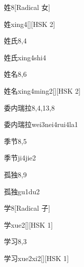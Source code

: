 \begin{entry}{姓}{8}[Radical 女]
  \begin{phonetics}{姓}{xing4}[][HSK 2]
  \end{phonetics}
\end{entry}

\begin{entry}{姓氏}{8,4}
  \begin{phonetics}{姓氏}{xing4shi4}
  \end{phonetics}
\end{entry}

\begin{entry}{姓名}{8,6}
  \begin{phonetics}{姓名}{xing4ming2}[][HSK 2]
  \end{phonetics}
\end{entry}

\begin{entry}{委内瑞拉}{8,4,13,8}
  \begin{phonetics}{委内瑞拉}{wei3nei4rui4la1}
  \end{phonetics}
\end{entry}

\begin{entry}{季节}{8,5}
  \begin{phonetics}{季节}{ji4jie2}
  \end{phonetics}
\end{entry}

\begin{entry}{孤独}{8,9}
  \begin{phonetics}{孤独}{gu1du2}
  \end{phonetics}
\end{entry}

\begin{entry}{学}{8}[Radical 子]
  \begin{phonetics}{学}{xue2}[][HSK 1]
  \end{phonetics}
\end{entry}

\begin{entry}{学习}{8,3}
  \begin{phonetics}{学习}{xue2xi2}[][HSK 1]
  \end{phonetics}
\end{entry}

